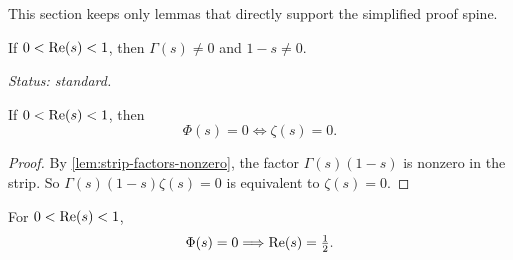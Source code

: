This section keeps only lemmas that directly support the simplified proof spine.

\begin{lemma}
\label{lem:strip-factors-nonzero}
If $0<\operatorname{Re}(s)<1$, then $\Gamma(s)\neq 0$ and $1-s\neq 0$.
\end{lemma}
\noindent\emph{Status: standard.}

\begin{lemma}
\label{lem:strip-zero-correspondence}
If $0<\operatorname{Re}(s)<1$, then
\[
\Phi(s)=0\iff\zeta(s)=0.
\]
\end{lemma}
\begin{proof}
By \cref{lem:strip-factors-nonzero}, the factor $\Gamma(s)(1-s)$ is nonzero in the strip.
So $\Gamma(s)(1-s)\zeta(s)=0$ is equivalent to $\zeta(s)=0$.
\end{proof}

\begin{lemma}
\label{lem:phi-critical-exclusion}
For $0<\operatorname{Re}(s)<1$,
\[
\Phi(s)=0\Longrightarrow \operatorname{Re}(s)=\tfrac12.
\]
\end{lemma}

